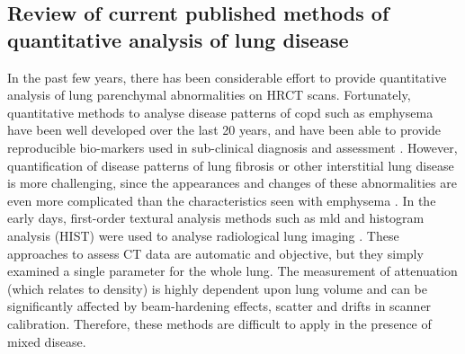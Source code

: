 \subsection{Review of current published methods of quantitative analysis of lung disease} \label{Review}
In the past few years, there has been considerable effort to provide quantitative analysis of lung parenchymal abnormalities on HRCT scans. Fortunately, quantitative methods to analyse disease patterns of \gls{copd} such as emphysema have been well developed over the last 20 years, and have been able to provide reproducible bio-markers used in sub-clinical diagnosis and assessment \citep{da2008identification,gietema2011quantifying,galban2012computed,wang2013high,castaldi2013distinct}. However, quantification of disease patterns of lung fibrosis or other interstitial lung disease is more challenging, since the appearances and changes of these abnormalities are even more complicated than the characteristics seen with emphysema \citep{lynch2007quantitative, delorme1997usual, galban2012computed, depeursinge2010comparative}. In the early days, first-order textural analysis methods such as \gls{mld} and histogram analysis (HIST) were used to analyse radiological lung imaging \citep{gilman1983ct,gould1988ct,muller1988density,kinsella1990quantitation,knudson1991expiratory,behr1992evaluation}. These approaches to assess CT data are automatic and objective, but they simply examined a single parameter for the whole lung. The measurement of attenuation (which relates to density) is highly dependent upon lung volume and can be significantly affected by beam-hardening effects, scatter and drifts in scanner calibration. Therefore, these methods are difficult to apply in the presence of mixed disease.

